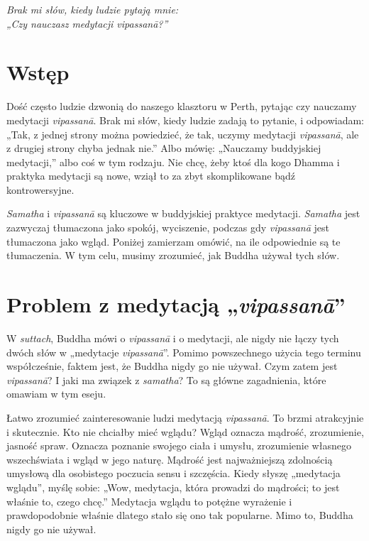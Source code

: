 \documentclass[12pt,openany]{book}
\begin{document}
 \newpage

\begin{center}\end{center}
\begin{center}

\vfill

\textit{\large Brak mi słów, kiedy ludzie pytają mnie: \\„Czy nauczasz medytacji vipassanā?”}

\vfill

\end{center}

\newpage
\mainmatter
\chapter*{Wstęp}

Dość często ludzie dzwonią do naszego klasztoru w Perth, pytając czy nauczamy medytacji \textit{vipassanā}. Brak mi słów, kiedy ludzie zadają to pytanie, i odpowiadam: „Tak, z jednej strony można powiedzieć, że tak, uczymy medytacji \textit{vipassanā}, ale z drugiej strony chyba jednak nie.” Albo mówię: „Nauczamy buddyjskiej medytacji,” albo coś w tym rodzaju. Nie chcę, żeby ktoś dla kogo Dhamma i praktyka medytacji są nowe, wziął to za zbyt skomplikowane bądź kontrowersyjne.


\textit{Samatha} i \textit{vipassanā} są kluczowe w buddyjskiej praktyce medytacji. \textit{Samatha} jest zazwyczaj tłumaczona jako spokój, wyciszenie, podczas gdy \textit{vipassanā} jest tłumaczona jako wgląd. Poniżej zamierzam omówić, na ile odpowiednie są te tłumaczenia. W tym celu, musimy zrozumieć, jak Buddha używał tych słów.

\chapter*{Problem z medytacją „\textit{vipassanā}”}

\pagestyle{fancy}

W \textit{suttach}, Buddha mówi o \textit{vipassanā} i o medytacji, ale nigdy nie łączy tych dwóch słów w „medytacje \textit{vipassanā}”. Pomimo powszechnego użycia tego terminu współcześnie, faktem jest, że Buddha nigdy go nie używał. Czym zatem jest \textit{vipassanā}? I jaki ma związek z \textit{samatha}? To są główne zagadnienia, które omawiam w tym eseju.

Łatwo zrozumieć zainteresowanie ludzi medytacją \textit{vipassanā}. To brzmi atrakcyjnie i skutecznie. Kto nie chciałby mieć wglądu? Wgląd oznacza mądrość, zrozumienie, jasność spraw. Oznacza poznanie swojego ciała i umysłu, zrozumienie własnego wszechświata i wgląd w jego naturę. Mądrość jest najważniejszą zdolnością umysłową dla osobistego poczucia sensu i szczęścia. Kiedy słyszę „medytacja wglądu”, myślę sobie: „Wow, medytacja, która prowadzi do mądrości; to jest właśnie to, czego chcę.” Medytacja wglądu to potężne wyrażenie i prawdopodobnie właśnie dlatego stało się ono tak popularne. Mimo to, Buddha nigdy go nie używał.
\end{document}
